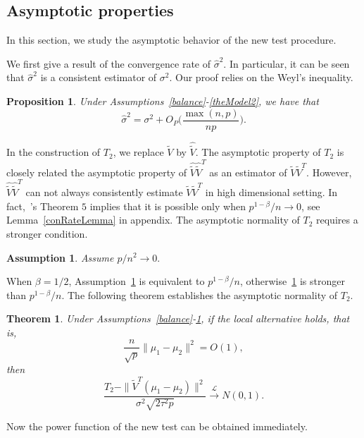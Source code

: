 \documentclass[review]{elsarticle}
\theoremstyle{plain}
\newtheorem{theorem}{\quad\quad Theorem}
\newtheorem{proposition}{\quad\quad Proposition}
\newtheorem{assumption}{\quad\quad Assumption}
\theoremstyle{definition}
\newtheorem{remark}{\quad\quad Remark}
\theoremstyle{remark}
\begin{document}
\subsection{Asymptotic properties}

In this section, we study the asymptotic behavior of the new test procedure.


 We first give a result of the convergence rate of $\hat{\sigma}^2$.
 In particular, it can be seen that $\hat{\sigma}^2$ is a consistent estimator of $\sigma^2$.   
 Our proof relies on the Weyl's inequality.
\begin{proposition}\label{varianceEstimation}
    Under Assumptions~\ref{balance}-\ref{theModel2}, we have that%
    $$
    \hat{\sigma}^2=\sigma^2 + O_P\Big(\frac{\max (n,p)}{np}\Big).
    $$
\end{proposition}

In the construction of $T_2$, we replace $\tilde{V}$ by $\hat{\tilde{V}}$.
The asymptotic property of $T_2$ is closely related the asymptotic property of $\hat{\tilde{V}}\hat{\tilde{V}}^T$ as an estimator of $\tilde{V}\tilde{V}^T$.
However, $\hat{\tilde{V}}\hat{\tilde{V}}^T$ can not always consistently estimate $\tilde{V}\tilde{V}^T$ in high dimensional setting.
In fact,~\cite{Tony2013}'s Theorem $5$ implies that it is possible only when $p^{1-\beta}/n\to 0$, see Lemma~\ref{conRateLemma} in appendix.
The asymptotic normality of $T_2$ requires a stronger condition.
\begin{assumption}\label{pAndN}
    Assume
    $
    {p}/{n^2}\to 0.
    $
\end{assumption}
When $\beta=1/2$, Assumption~\ref{pAndN} is equivalent to $p^{1-\beta}/n$, otherwise~\ref{pAndN} is stronger than $p^{1-\beta}/n$.
The following theorem establishes the asymptotic normality of $T_2$.
\begin{theorem}\label{myPanpan}
    Under Assumptions~\ref{balance}-\ref{pAndN},
if the local alternative holds, that is,
    $$\frac{n}{\sqrt{p}}\|\mu_1-\mu_2\|^2=O(1),$$
then 
\begin{equation*}
        \frac{T_2-\|\tilde{V}^T(\mu_1-\mu_2)\|^2}{\sigma^2\sqrt{2\tau^2 p}}\xrightarrow{\mathcal{L}}N(0,1).
\end{equation*}
\end{theorem} 
Now the power function of the new test can be obtained immediately.
\end{document}
